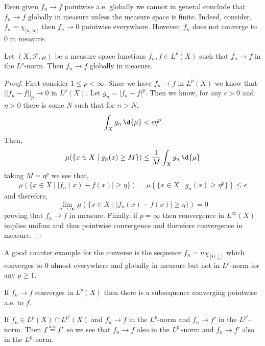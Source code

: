 \documentclass[12pt]{article}
\newcommand\eqae{\mathrel{\stackrel{\makebox[0pt]{\mbox{\normalfont\tiny a.e.}}}{=}}}
\renewcommand{\F}{\mathcal{F}}
\begin{document}
\begin{rmk}
Even given $f_n \to f$ pointwise a.e. globally we cannot in general conclude that $f_n \to f$ globally in measure unless the measure space is finite. Indeed, consider, $f_n = \chi_{[n, \infty)}$ then $f_n \to 0$ pointwise everywhere. However, $f_n$ does not converge to $0$ in measure. 
\end{rmk}


\begin{prop}
Let $(X, \F, \mu)$ be a measure space functions $f_n, f \in L^p(X)$ such that $f_n \to f$ in the $L^p$-norm. Then $f_n \to f$ globally in measure.
\end{prop}

\begin{proof}
First consider $1 \le p < \infty$. Since we have $f_n \to f$ in $L^p(X)$ we know that $|| f_n - f ||_p \to 0$ in $L^p(X)$. Let $g_n = |f_n - f|^p$. Then we know, for any $\epsilon > 0$ and $\eta > 0$ there is some $N$ such that for $n > N$,
\[ \int_X g_n \, \d{\mu} < \epsilon \eta^p \]
Then, 
\[ \mu(\{ x \in X \mid g_n(x) \ge M \}) \le \frac{1}{M} \int_X g_n \, \d{\mu} \]
taking $M = \eta^p$ we see that,
\[ \mu(\{ x \in X \mid |f_n(x) - f(x)| \ge \eta \}) = \mu(\{ x \in X \mid g_n(x) \ge \eta^p \}) \le \epsilon \]
and therefore,
\[ \lim_{n \to \infty} \mu(\{ x \in X \mid |f_n(x) - f(x)| \ge \eta \}) = 0 \]
proving that $f_n \to f$ in measure. Finally, if $p = \infty$ then convergence in $L^\infty(X)$ implies unifom and thus pointwise convergence and therefore convergence in measure.
\end{proof}

\begin{rmk}
A good counter example for the converse is the sequence $f_n = n \chi_{[0, \frac{1}{n}]}$ which converges to $0$ almost everywhere and globally in measure but not in $L^p$-norm for any $p \ge 1$.
\end{rmk}

\begin{cor}
If $f_n \to f$ converges in $L^p(X)$ then there is a subsequence converging pointwise a.e. to $f$.
\end{cor}

\begin{cor}
If $f_n \in L^p(X) \cap L^{p'}(X)$ and $f_n \to f$ in the $L^p$-norm and $f_n \to f'$ in the $L^{p'}$-norm. Then $f \eqae f'$ so we see that $f_n \to f$ also in the $L^{p'}$-norm and $f_n \to f'$ also in the $L^p$-norm.
\end{cor}
\end{document}
